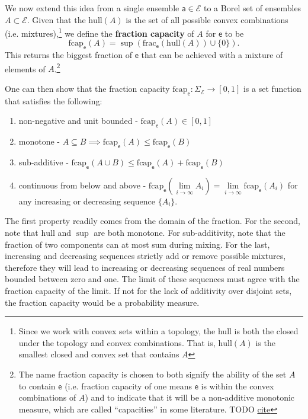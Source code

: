 \documentclass[10pt,twocolumn, nofootinbib]{revtex4-2}
\newcommand\hull{\mathrm{hull}}
\newcommand\fraction{\mathrm{frac}}
\newcommand\frcap{\mathrm{fcap}}
\newcommand{\ens}[1][e] {\mathsf{#1}} %
\newcommand{\Ens}[1][E] {\mathcal{#1}} %
\begin{document}
We now extend this idea from a single ensemble $\ens[a] \in \Ens$ to a Borel set of ensembles $A \subset \Ens$. Given that the $\hull(A)$ is the set of all possible convex combinations (i.e. mixtures),\footnote{Since we work with convex sets within a topology, the hull is both the closed under the topology and convex combinations. That is, $\hull(A)$ is the smallest closed and convex set that contains $A$} we define the \textbf{fraction capacity} of $A$ for $\ens$ to be
\begin{equation}
	\frcap_{\ens}(A) = \sup(\fraction_{\ens}(\hull(A))\cup\{0\}).
\end{equation}
This returns the biggest fraction of $\ens$ that can be achieved with a mixture of elements of $A$.\footnote{The name fraction capacity is chosen to both signify the ability of the set $A$ to contain $\ens$ (i.e. fraction capacity of one means $\ens$ is within the convex combinations of $A$) and to indicate that it will be a non-additive monotonic measure, which are called ``capacities'' in some literature. TODO \href{ https://link.springer.com/book/10.1007/978-3-319-03155-2}{cite} }

One can then show that the fraction capacity $\frcap_{\ens} : \Sigma_{\Ens} \to [0,1]$ is a set function that satisfies the following:
\begin{enumerate}
	\item non-negative and unit bounded - $\frcap_{\ens}(A) \in [0,1]$
	\item monotone - $A \subseteq B \implies \frcap_{\ens}(A) \leq \frcap_{\ens}(B)$
	\item sub-additive - $\frcap_{\ens}(A \cup B) \leq \frcap_{\ens}(A) + \frcap_{\ens}(B)$
	\item continuous from below and above - $\frcap_{\ens}(\lim\limits_{i \to \infty} A_i) = \lim\limits_{i \to \infty} \frcap_{\ens}(A_i)$ for any increasing or decreasing sequence $\{A_i\}$.
\end{enumerate}

The first property readily comes from the domain of the fraction. For the second, note that $\hull$ and $\sup$ are both monotone. For sub-additivity, note that the fraction of two components can at most sum during mixing. For the last, increasing and decreasing sequences strictly add or remove possible mixtures, therefore they will lead to increasing or decreasing sequences of real numbers bounded between zero and one. The limit of these sequences must agree with the fraction capacity of the limit. If not for the lack of additivity over disjoint sets, the fraction capacity would be a probability measure.
\end{document}
